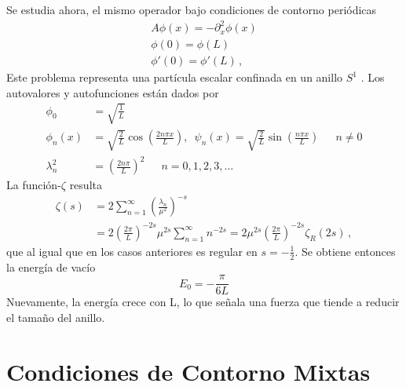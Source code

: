 Se estudia ahora, el mismo operador bajo condiciones de contorno periódicas
\begin{equation}
\begin{array}{c}
	A \phi (x) = - \partial _x ^2 \phi (x) \\[5pt]
    \phi (0) = \phi (L)  \\[5pt]
    \phi ' (0) = \phi ' (L) \, ,
\end{array}
\end{equation}
Este problema representa una partícula escalar confinada en un anillo $S ^1$ .
Los autovalores y autofunciones están dados por
\begin{align}
\nonumber
	\phi _{0} &= \sqrt{\frac{1}{L}} 
\\[5pt]
\nonumber
	\phi _{n} (x) &= \sqrt{\frac{2}{L}} \cos \left( \frac{2 n \pi x}{L} 
	\right),
	\, \, \,  \psi _n (x) =\sqrt{\frac{2}{L}} \sin \left( \frac{n \pi 		x}{L} \right) 
	\, \, \, \, \, \, \, \, \, n \neq 0
	\\[5pt]
	\lambda ^2 _n  &= \left( \frac{2 n \pi }{L} \right) ^2 
	\, \, \, \, \, \, \, \, \,
	 n = 0,1,2,3, \dots
\end{align}
La función-$\zeta$ resulta
\begin{align}
\nonumber
	\zeta  (s) &= 
	2 \sum _{n=1} ^{\infty} \left( \frac{\lambda _n}{\mu ^2} \right)^
	{-s} 
	\\[5pt]
&=  2 \left( \frac{2 \pi}{L} \right) ^{-2s} \mu ^{2s} \sum _{n=1} ^{\infty} n ^{-2s} =  
2 \mu ^{2s} \left( \frac{2 \pi}{L} \right) ^{-2s} \zeta _R (2s)
\, ,
\end{align}
que al igual que en los casos anteriores es regular en $s=- \frac{1}{2}$. Se obtiene
entonces la energía de vacío
\begin{equation}
E _0 = - \frac{\pi}{6 L}
\end{equation}
Nuevamente, la energía crece con L, lo que señala una fuerza que tiende a
reducir el tamaño del anillo.

\section{Condiciones de Contorno Mixtas}


